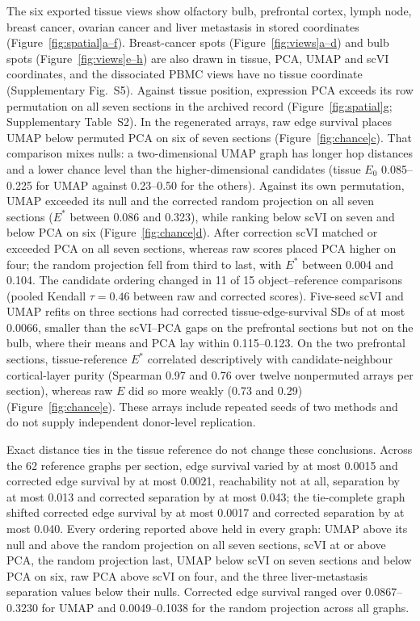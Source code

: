 \documentclass[11pt]{article}
\newcommand{\figpanel}[2]{Figure~\hyperref[#1]{\ref*{#1}#2}}
\begin{document}
The six exported tissue views show olfactory bulb, prefrontal cortex, lymph node, breast cancer, ovarian cancer and liver metastasis in stored coordinates (\figpanel{fig:spatial}{a--f}). Breast-cancer spots (\figpanel{fig:views}{a--d}) and bulb spots (\figpanel{fig:views}{e--h}) are also drawn in tissue, PCA, UMAP and scVI coordinates, and the dissociated PBMC views have no tissue coordinate (Supplementary Fig.~S5). Against tissue position, expression PCA exceeds its row permutation on all seven sections in the archived record (\figpanel{fig:spatial}{g}; Supplementary Table~S2). In the regenerated arrays, raw edge survival places UMAP below permuted PCA on six of seven sections (\figpanel{fig:chance}{c}). That comparison mixes nulls: a two-dimensional UMAP graph has longer hop distances and a lower chance level than the higher-dimensional candidates (tissue $E_0$ 0.085--0.225 for UMAP against 0.23--0.50 for the others). Against its own permutation, UMAP exceeded its null and the corrected random projection on all seven sections ($E^*$ between 0.086 and 0.323), while ranking below scVI on seven and below PCA on six (\figpanel{fig:chance}{d}). After correction scVI matched or exceeded PCA on all seven sections, whereas raw scores placed PCA higher on four; the random projection fell from third to last, with $E^*$ between 0.004 and 0.104. The candidate ordering changed in 11 of 15 object--reference comparisons (pooled Kendall $\tau=0.46$ between raw and corrected scores). Five-seed scVI and UMAP refits on three sections had corrected tissue-edge-survival SDs of at most 0.0066, smaller than the scVI--PCA gaps on the prefrontal sections but not on the bulb, where their means and PCA lay within 0.115--0.123. On the two prefrontal sections, tissue-reference $E^*$ correlated descriptively with candidate-neighbour cortical-layer purity (Spearman 0.97 and 0.76 over twelve nonpermuted arrays per section), whereas raw $E$ did so more weakly (0.73 and 0.29) (\figpanel{fig:chance}{e}). These arrays include repeated seeds of two methods and do not supply independent donor-level replication.

Exact distance ties in the tissue reference do not change these conclusions. Across the 62 reference graphs per section, edge survival varied by at most 0.0015 and corrected edge survival by at most 0.0021, reachability not at all, separation by at most 0.013 and corrected separation by at most 0.043; the tie-complete graph shifted corrected edge survival by at most 0.0017 and corrected separation by at most 0.040. Every ordering reported above held in every graph: UMAP above its null and above the random projection on all seven sections, scVI at or above PCA, the random projection last, UMAP below scVI on seven sections and below PCA on six, raw PCA above scVI on four, and the three liver-metastasis separation values below their nulls. Corrected edge survival ranged over 0.0867--0.3230 for UMAP and 0.0049--0.1038 for the random projection across all graphs.
\end{document}
